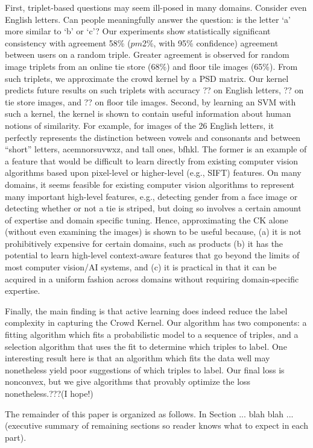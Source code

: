 \documentclass{article}
\begin{document}
First, triplet-based questions may seem ill-posed in many domains.  Consider even English letters.  Can people meaningfully answer the question: is the letter `a' more similar to `b' or `c'?  Our experiments show statistically significant consistency with agreement 58\% ($pm$2\%, with 95\% confidence) agreement between users on a random triple.  Greater agreement is observed for random image triplets from an online tie store (68\%) and floor tile images (65\%).  From such triplets, we approximate the crowd kernel by a PSD matrix.  Our kernel predicts future results on such triplets with accuracy ?? on English letters, ?? on tie store images, and ?? on floor tile images.  Second, by learning an SVM with such a kernel, the kernel is shown to contain useful information about human notions of similarity.  For example, for images of the 26 English letters, it perfectly represents the distinction between vowels and consonants and between ``short'' letters, acemnorsuvwxz, and tall ones, bfhkl.  The former is an example of a feature that would be difficult to learn directly from existing computer vision algorithms based upon pixel-level or higher-level (e.g., SIFT) features.  On many domains, it seems feasible for existing computer vision algorithms to represent many important high-level features, e.g., detecting gender from a face image or detecting whether or not a tie is striped, but doing so involves a certain amount of expertise and domain specific tuning.  Hence, approximating the CK alone (without even examining the images) is shown to be useful because, (a) it is not prohibitively expensive for certain domains, such as products (b) it has the potential to learn high-level context-aware features that go beyond the limits of most computer vision/AI systems, and (c) it is practical in that it can be acquired in a uniform fashion across domains without requiring domain-specific expertise.

Finally, the main finding is that active learning does indeed reduce the label complexity in capturing the Crowd Kernel.  Our algorithm has two components: a fitting algorithm which fits a probabilistic model to a sequence of triples, and a selection algorithm that uses the fit to determine which triples to label.  One interesting result here is that an algorithm which fits the data well may nonetheless yield poor suggestions of which triples to label.  Our final loss is nonconvex, but we give algorithms that provably optimize the loss nonetheless.???(I hope!)

The remainder of this paper is organized as follows.  In Section ... blah blah ... (executive summary of remaining sections so reader knows what to expect in each part).
\end{document}

